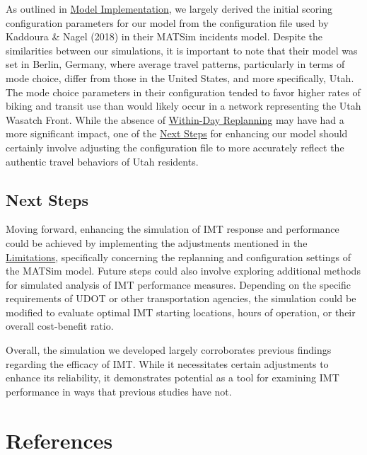 \documentclass[fancy, oneside, mastersfancy, ms]{byuthesis}
\begin{document}
As outlined in \protect\hyperlink{sec-model_imp}{Model Implementation},
we largely derived the initial scoring configuration parameters for our
model from the configuration file used by Kaddoura \& Nagel (2018) in
their MATSim incidents model. Despite the similarities between our
simulations, it is important to note that their model was set in Berlin,
Germany, where average travel patterns, particularly in terms of mode
choice, differ from those in the United States, and more specifically,
Utah. The mode choice parameters in their configuration tended to favor
higher rates of biking and transit use than would likely occur in a
network representing the Utah Wasatch Front. While the absence of
\protect\hyperlink{sec-within-day}{Within-Day Replanning} may have had a
more significant impact, one of the
\protect\hyperlink{sec-next_steps}{Next Steps} for enhancing our model
should certainly involve adjusting the configuration file to more
accurately reflect the authentic travel behaviors of Utah residents.

\hypertarget{sec-next_steps}{%
\section{Next Steps}\label{sec-next_steps}}

Moving forward, enhancing the simulation of IMT response and performance
could be achieved by implementing the adjustments mentioned in the
\protect\hyperlink{sec-limitations}{Limitations}, specifically
concerning the replanning and configuration settings of the MATSim
model. Future steps could also involve exploring additional methods for
simulated analysis of IMT performance measures. Depending on the
specific requirements of UDOT or other transportation agencies, the
simulation could be modified to evaluate optimal IMT starting locations,
hours of operation, or their overall cost-benefit ratio.

Overall, the simulation we developed largely corroborates previous
findings regarding the efficacy of IMT. While it necessitates certain
adjustments to enhance its reliability, it demonstrates potential as a
tool for examining IMT performance in ways that previous studies have
not.


\hypertarget{references}{%
\chapter*{References}\label{references}}
\end{document}
